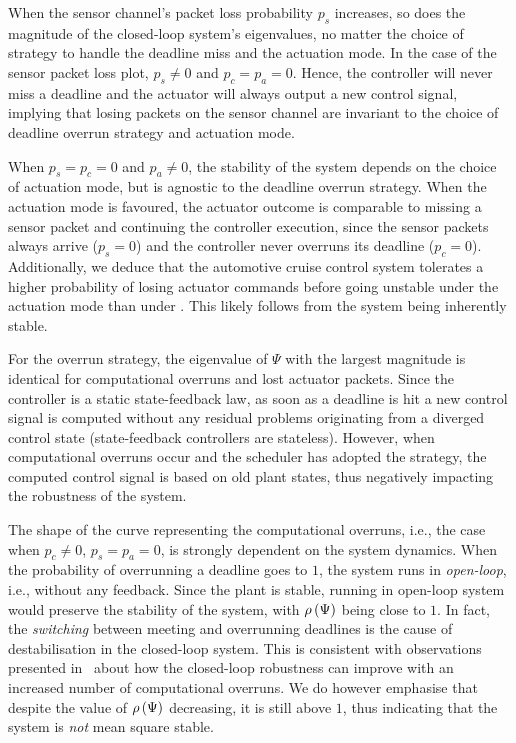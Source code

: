 When the sensor channel's packet loss probability $p_s$ increases, so does the magnitude of the closed-loop system's eigenvalues, no matter the choice of strategy to handle the deadline miss and the actuation mode.
In the case of the sensor packet loss plot, $p_s \neq 0$ and $p_c = p_a = 0$.
Hence, the controller will never miss a deadline and the actuator will always output a new control signal, implying that losing packets on the sensor channel are invariant to the choice of deadline overrun strategy and actuation mode.

When $p_s = p_c=0$ and $p_a \neq 0$, the stability of the system depends on the choice of actuation mode, but is agnostic to the deadline overrun strategy.
When the \tH{} actuation mode is favoured, the actuator outcome is comparable to missing a sensor packet and continuing the controller execution, since the sensor packets always arrive ($p_s=0$) and the controller never overruns its deadline ($p_c=0$).
Additionally, we deduce that the automotive cruise control system tolerates a higher probability of losing actuator commands before going unstable under the \tZ{} actuation mode than under \tH{}.
This likely follows from the system being inherently stable.

For the \tK{} overrun strategy, the eigenvalue of $\Psi$ with the largest magnitude is identical for computational overruns and lost actuator packets.
Since the controller is a static state-feedback law, as soon as a deadline is hit a new control signal is computed without any residual problems originating from a diverged control state (state-feedback controllers are stateless).
However, when computational overruns occur and the scheduler has adopted the \tS{} strategy, the computed control signal is based on old plant states, thus negatively impacting the robustness of the system.

The shape of the curve representing the computational overruns, i.e., the case when $p_c \neq 0$, $p_s = p_a = 0$, is strongly dependent on the system dynamics.
When the probability of overrunning a deadline goes to $1$, the system runs in \emph{open-loop}, i.e., without any feedback.
Since the plant is stable, running in open-loop system would preserve the stability of the system, with $\rho\left( \Psi \right)$ being close to $1$.
In fact, the \emph{switching} between meeting and overrunning deadlines is the cause of destabilisation in the closed-loop system.
This is consistent with observations presented in~\cite{Vreman:2021} about how the closed-loop robustness can improve with an increased number of computational overruns.
We do however emphasise that despite the value of $\rho\left( \Psi \right)$ decreasing, it is still above $1$, thus indicating that the system is \emph{not} mean square stable.

